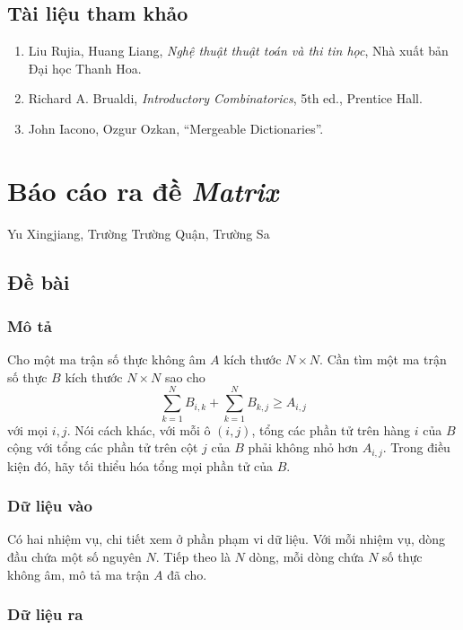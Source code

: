 \documentclass[11pt]{article}
\begin{document}
\subsection*{Tài liệu tham khảo}

\begin{enumerate}
  \item Liu Rujia, Huang Liang, \emph{Nghệ thuật thuật toán và thi tin học},
  Nhà xuất bản Đại học Thanh Hoa.
  \item Richard A. Brualdi, \emph{Introductory Combinatorics}, 5th ed.,
  Prentice Hall.
  \item John Iacono, Ozgur Ozkan, ``Mergeable Dictionaries''.
\end{enumerate}

\section{Báo cáo ra đề \emph{Matrix}}

\begin{center}
Yu Xingjiang, Trường Trường Quận, Trường Sa
\end{center}

\subsection{Đề bài}

\subsubsection{Mô tả}

Cho một ma trận số thực không âm \(A\) kích thước \(N\times N\). Cần tìm một ma
trận số thực \(B\) kích thước \(N\times N\) sao cho
\[
  \sum_{k=1}^{N} B_{i,k}+\sum_{k=1}^{N} B_{k,j}\ge A_{i,j}
\]
với mọi \(i,j\). Nói cách khác, với mỗi ô \((i,j)\), tổng các phần tử trên hàng
\(i\) của \(B\) cộng với tổng các phần tử trên cột \(j\) của \(B\) phải không
nhỏ hơn \(A_{i,j}\). Trong điều kiện đó, hãy tối thiểu hóa tổng mọi phần tử của
\(B\).

\subsubsection{Dữ liệu vào}

Có hai nhiệm vụ, chi tiết xem ở phần phạm vi dữ liệu. Với mỗi nhiệm vụ, dòng đầu
chứa một số nguyên \(N\). Tiếp theo là \(N\) dòng, mỗi dòng chứa \(N\) số thực
không âm, mô tả ma trận \(A\) đã cho.

\subsubsection{Dữ liệu ra}
\end{document}
